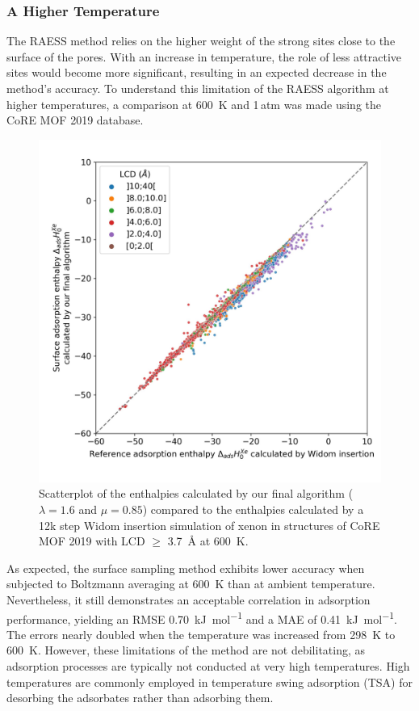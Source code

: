 \documentclass[main]{subfiles}
\begin{document}
\subsubsection{A Higher Temperature}

The RAESS method relies on the higher weight of the strong sites close to the surface of the pores. With an increase in temperature, the role of less attractive sites would become more significant, resulting in an expected decrease in the method's accuracy. To understand this limitation of the RAESS algorithm at higher temperatures, a comparison at \SI{600}{\kelvin} and 1\,atm was made using the CoRE MOF 2019 database.

\begin{figure}[ht]
\centering
  \includegraphics[width=0.5\linewidth]{figures/3-fastsim/H_Xe_widom_vs_H_Xe_surface_final_zoom_600K.jpeg}
  \caption{Scatterplot of the enthalpies calculated by our final algorithm ($\lambda=1.6$ and $\mu=0.85$) compared to the enthalpies calculated by a 12k step Widom insertion simulation of xenon in structures of CoRE MOF 2019 with LCD $\geq$ \SI{3.7}{\angstrom} at \SI{600}{\kelvin}. }
\end{figure}

As expected, the surface sampling method exhibits lower accuracy when subjected to Boltzmann averaging at \SI{600}{\kelvin} than at ambient temperature. Nevertheless, it still demonstrates an acceptable correlation in adsorption performance, yielding an RMSE \SI{0.70}{\kilo\joule\per\mole} and a MAE of \SI{0.41}{\kilo\joule\per\mole}. The errors nearly doubled when the temperature was increased from \SI{298}{\kelvin} to \SI{600}{\kelvin}. However, these limitations of the method are not debilitating, as adsorption processes are typically not conducted at very high temperatures. High temperatures are commonly employed in temperature swing adsorption (TSA) for desorbing the adsorbates rather than adsorbing them.
\end{document}
